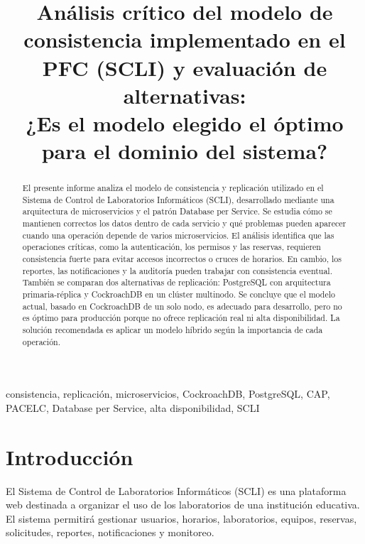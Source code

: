 \documentclass[conference]{IEEEtran}
\begin{document}
\title{Análisis crítico del modelo de consistencia implementado en el PFC (SCLI) y evaluación de alternativas: \\¿Es el modelo elegido el óptimo para el dominio del sistema?}

\author{
}

\maketitle

\begin{abstract}
El presente informe analiza el modelo de consistencia y replicación utilizado en el Sistema de Control de Laboratorios Informáticos (SCLI), desarrollado mediante una arquitectura de microservicios y el patrón Database per Service. Se estudia cómo se mantienen correctos los datos dentro de cada servicio y qué problemas pueden aparecer cuando una operación depende de varios microservicios. El análisis identifica que las operaciones críticas, como la autenticación, los permisos y las reservas, requieren consistencia fuerte para evitar accesos incorrectos o cruces de horarios. En cambio, los reportes, las notificaciones y la auditoría pueden trabajar con consistencia eventual. También se comparan dos alternativas de replicación: PostgreSQL con arquitectura primaria-réplica y CockroachDB en un clúster multinodo. Se concluye que el modelo actual, basado en CockroachDB de un solo nodo, es adecuado para desarrollo, pero no es óptimo para producción porque no ofrece replicación real ni alta disponibilidad. La solución recomendada es aplicar un modelo híbrido según la importancia de cada operación.
\end{abstract}

\begin{IEEEkeywords}
consistencia, replicación, microservicios, CockroachDB, PostgreSQL, CAP, PACELC, Database per Service, alta disponibilidad, SCLI
\end{IEEEkeywords}

\section{Introducción}
El Sistema de Control de Laboratorios Informáticos (SCLI) es una plataforma web destinada a organizar el uso de los laboratorios de una institución educativa. El sistema permitirá gestionar usuarios, horarios, laboratorios, equipos, reservas, solicitudes, reportes, notificaciones y monitoreo.
\end{document}
